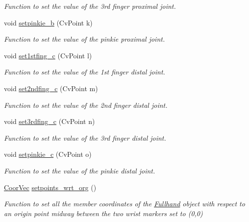 \begin{DoxyCompactItemize}
\begin{DoxyCompactList}\small\item\em Function to set the value of the 3rd finger proximal joint. \end{DoxyCompactList}\item 
void \hyperlink{classFullhand_adeb2b0887624feb3d963311254fd26da}{setpinkie\_\-b} (CvPoint k)
\begin{DoxyCompactList}\small\item\em Function to set the value of the pinkie proximal joint. \end{DoxyCompactList}\item 
void \hyperlink{classFullhand_a086ad19d367ae967f4b873ca2e86b9f8}{set1stfing\_\-c} (CvPoint l)
\begin{DoxyCompactList}\small\item\em Function to set the value of the 1st finger distal joint. \end{DoxyCompactList}\item 
void \hyperlink{classFullhand_ac015734d9709a1cda406efe9ed853a3b}{set2ndfing\_\-c} (CvPoint m)
\begin{DoxyCompactList}\small\item\em Function to set the value of the 2nd finger distal joint. \end{DoxyCompactList}\item 
void \hyperlink{classFullhand_a2da1b866a13f5c0e2dc06a55a0caa13b}{set3rdfing\_\-c} (CvPoint n)
\begin{DoxyCompactList}\small\item\em Function to set the value of the 3rd finger distal joint. \end{DoxyCompactList}\item 
void \hyperlink{classFullhand_a8a6857d6dcdefe5720ef8539e9b959de}{setpinkie\_\-c} (CvPoint o)
\begin{DoxyCompactList}\small\item\em Function to set the value of the pinkie distal joint. \end{DoxyCompactList}\item 
\hyperlink{blobby_8h_a7017012a1393f7249d0e03d6ac9f1c7b}{CoorVec} \hyperlink{classFullhand_a7102dde6836428200b958cb69302754a}{setpoints\_\-wrt\_\-org} ()
\begin{DoxyCompactList}\small\item\em Function to set all the member coordinates of the \hyperlink{classFullhand}{Fullhand} object with respect to an origin point midway between the two wrist markers set to (0,0) \end{DoxyCompactList}\item 

\end{DoxyCompactItemize}
